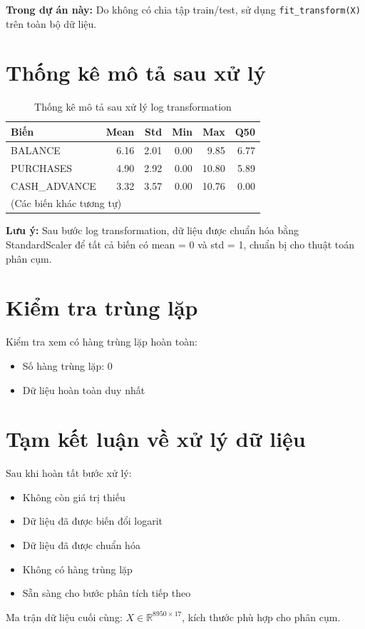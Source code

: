 \textbf{Trong dự án này:} Do không có chia tập train/test, sử dụng \texttt{fit\_transform(X)} trên toàn bộ dữ liệu.

\section{Thống kê mô tả sau xử lý}

\begin{table}[H]
\centering
\caption{Thống kê mô tả sau xử lý log transformation}
\begin{tabular}{|l|r|r|r|r|r|}
\hline
\textbf{Biến} & \textbf{Mean} & \textbf{Std} & \textbf{Min} & \textbf{Max} & \textbf{Q50} \\
\hline
BALANCE & 6.16 & 2.01 & 0.00 & 9.85 & 6.77 \\
\hline
PURCHASES & 4.90 & 2.92 & 0.00 & 10.80 & 5.89 \\
\hline
CASH\_ADVANCE & 3.32 & 3.57 & 0.00 & 10.76 & 0.00 \\
\hline
\multicolumn{6}{|l|}{(Các biến khác tương tự)} \\
\hline
\end{tabular}
\end{table}

\textbf{Lưu ý:} Sau bước log transformation, dữ liệu được chuẩn hóa bằng StandardScaler để tất cả biến có mean = 0 và std = 1, chuẩn bị cho thuật toán phân cụm.

\section{Kiểm tra trùng lặp}

Kiểm tra xem có hàng trùng lặp hoàn toàn:
\begin{itemize}
    \item Số hàng trùng lặp: 0
    \item Dữ liệu hoàn toàn duy nhất
\end{itemize}

\section{Tạm kết luận về xử lý dữ liệu}

Sau khi hoàn tất bước xử lý:
\begin{itemize}
    \item Không còn giá trị thiếu
    \item Dữ liệu đã được biến đổi logarit
    \item Dữ liệu đã được chuẩn hóa
    \item Không có hàng trùng lặp
    \item Sẵn sàng cho bước phân tích tiếp theo
\end{itemize}

Ma trận dữ liệu cuối cùng: $X \in \mathbb{R}^{8950 \times 17}$, kích thước phù hợp cho phân cụm.
